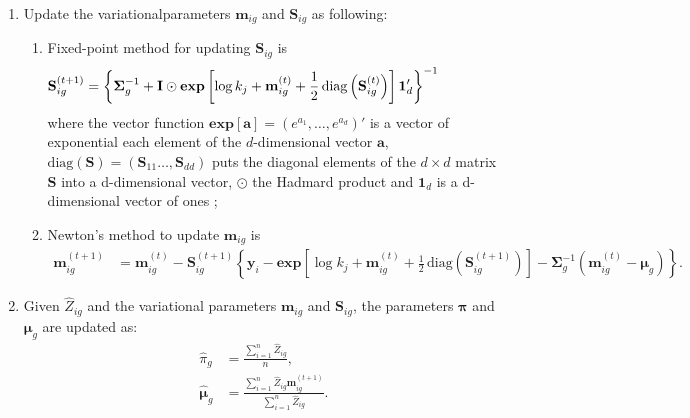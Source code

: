 \documentclass[12pt]{article}
\newcommand{\bI}{\mathbf{I}}
\newcommand{\bS}{\mathbf{S}}
\newcommand{\bmm}{\mathbf{m}}
\newcommand{\by}{\mathbf{y}}
\newcommand{\bpi}{\boldsymbol{\pi}}
\newcommand{\bmu}{\boldsymbol{\mu}}
\newcommand{\bSigma}{\boldsymbol{\Sigma}}
\newcommand{\diag}{\,\mbox{diag}}
\begin{document}
\begin{enumerate}
\item Update the variationalparameters $\bmm_{ig}$ and $\bS_{ig}$ as following:
\begin{enumerate}
 \item Fixed-point method for updating $\mathbf{S}_{ig}$ is
\begin{align*}
\hspace{-0.65in} \mathbf{S}_{ig}^{(t+1)}=\left\{\bSigma_g^{-1}+ \bI \odot \mathbf{exp}\left[\log k_j+\bmm_{ig}^{(t)}+\frac{1}{2} \diag \left(\mathbf{S}_{ig}^{(t)}\right)\right] \mathbf{1}_d'  \right\}^{-1}
\end{align*}
where the vector function $\mathbf{exp}\left[ \mathbf{a} \right] = (e^{a_1}, \ldots, e^{a_d})'$ is a vector of exponential each element of the $d$-dimensional vector $\mathbf{a}$, $\mbox{diag}( \mathbf{S} ) = ( \mathbf{S}_{11} \ldots,  \mathbf{S}_{dd})$ puts the diagonal elements of the $d\times d$ matrix  $\mathbf{S}$ into a d-dimensional vector, $\odot$ the Hadmard product and $\mathbf{1}_d$ is a d-dimensional vector of ones ;
\item Newton's method to update $\bmm_{ig}$ is
\begin{align*}
 \bmm_{ig}^{(t+1)}&=\bmm_{ig}^{(t)}\! -\! \mathbf{S}_{ig}^{(t+1)}\! \left\{ \! \by_i - \mathbf{exp}\left[\log k_j+\bmm_{ig}^{(t)}\! +\! \frac{1}{2}\diag\left(\mathbf{S}_{ig}^{(t+1)}\right)\right]\! -\! \bSigma_g^{-1} \left(\bmm_{ig}^{(t)}-\bmu_g\right)\! \right\}\!.
\end{align*}
\end{enumerate}
\item Given $\widehat{Z}_{ig}$ and the variational parameters $\bmm_{ig}$ and $\mathbf{S}_{ig}$, the parameters $\bpi$ and $\bmu_g$ are updated as:
\begin{align*}
\widehat{\pi}_g&=\frac{\sum_{i=1}^n \widehat{Z}_{ig}}{n},\\
\widehat{\bmu}_g& = \frac{\sum_{i=1}^n \widehat{Z}_{ig} \bmm_{ig}^{(t+1)}}{\sum_{i=1}^n \widehat{Z}_{ig}}.
\end{align*}
\end{enumerate}
\end{document}
